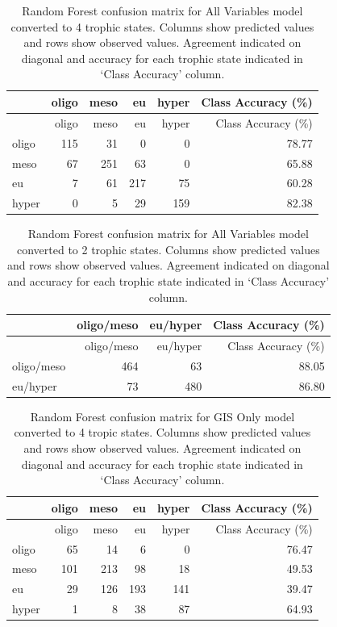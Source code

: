 \documentclass[11pt,]{article}
\begin{document}
\newpage

\begin{longtable}[c]{@{}lrrrrr@{}}
\caption{Random Forest confusion matrix for All Variables model
converted to 4 trophic states. Columns show predicted values and rows
show observed values. Agreement indicated on diagonal and accuracy for
each trophic state indicated in `Class Accuracy' column.
\label{tab:Confusion_All_4}}\tabularnewline
\toprule
& oligo & meso & eu & hyper & Class Accuracy (\%)\tabularnewline
\midrule
\endfirsthead
\toprule
& oligo & meso & eu & hyper & Class Accuracy (\%)\tabularnewline
\midrule
\endhead
oligo & 115 & 31 & 0 & 0 & 78.77\tabularnewline
meso & 67 & 251 & 63 & 0 & 65.88\tabularnewline
eu & 7 & 61 & 217 & 75 & 60.28\tabularnewline
hyper & 0 & 5 & 29 & 159 & 82.38\tabularnewline
\bottomrule
\end{longtable}

\newpage

\begin{longtable}[c]{@{}lrrr@{}}
\caption{Random Forest confusion matrix for All Variables model
converted to 2 trophic states. Columns show predicted values and rows
show observed values. Agreement indicated on diagonal and accuracy for
each trophic state indicated in `Class Accuracy' column.
\label{tab:Confusion_All_2}}\tabularnewline
\toprule
& oligo/meso & eu/hyper & Class Accuracy (\%)\tabularnewline
\midrule
\endfirsthead
\toprule
& oligo/meso & eu/hyper & Class Accuracy (\%)\tabularnewline
\midrule
\endhead
oligo/meso & 464 & 63 & 88.05\tabularnewline
eu/hyper & 73 & 480 & 86.80\tabularnewline
\bottomrule
\end{longtable}

\newpage

\begin{longtable}[c]{@{}lrrrrr@{}}
\caption{Random Forest confusion matrix for GIS Only model converted to
4 tropic states. Columns show predicted values and rows show observed
values. Agreement indicated on diagonal and accuracy for each trophic
state indicated in `Class Accuracy' column.
\label{tab:Confusion_GIS_4}}\tabularnewline
\toprule
& oligo & meso & eu & hyper & Class Accuracy (\%)\tabularnewline
\midrule
\endfirsthead
\toprule
& oligo & meso & eu & hyper & Class Accuracy (\%)\tabularnewline
\midrule
\endhead
oligo & 65 & 14 & 6 & 0 & 76.47\tabularnewline
meso & 101 & 213 & 98 & 18 & 49.53\tabularnewline
eu & 29 & 126 & 193 & 141 & 39.47\tabularnewline
hyper & 1 & 8 & 38 & 87 & 64.93\tabularnewline
\bottomrule
\end{longtable}
\end{document}
